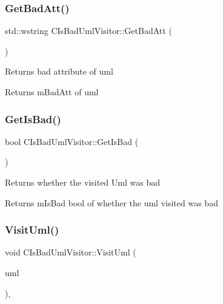 \subsubsection{\texorpdfstring{GetBadAtt()}{GetBadAtt()}}
{\footnotesize\ttfamily std\+::wstring C\+Is\+Bad\+Uml\+Visitor\+::\+Get\+Bad\+Att (\begin{DoxyParamCaption}{ }\end{DoxyParamCaption})\hspace{0.3cm}{\ttfamily [inline]}}

Returns bad attribute of uml \begin{DoxyReturn}{Returns}
m\+Bad\+Att of uml 
\end{DoxyReturn}
\mbox{\label{class_c_is_bad_uml_visitor_ad7abecc1adc872930e938ef4528fd44e}} 
\subsubsection{\texorpdfstring{GetIsBad()}{GetIsBad()}}
{\footnotesize\ttfamily bool C\+Is\+Bad\+Uml\+Visitor\+::\+Get\+Is\+Bad (\begin{DoxyParamCaption}{ }\end{DoxyParamCaption})\hspace{0.3cm}{\ttfamily [inline]}}

Returns whether the visited Uml was bad \begin{DoxyReturn}{Returns}
m\+Is\+Bad bool of whether the uml visited was bad 
\end{DoxyReturn}
\mbox{\label{class_c_is_bad_uml_visitor_a749753fc1c57d534faf60a016a4fd745}} 
\subsubsection{\texorpdfstring{VisitUml()}{VisitUml()}}
{\footnotesize\ttfamily void C\+Is\+Bad\+Uml\+Visitor\+::\+Visit\+Uml (\begin{DoxyParamCaption}\item[{\mbox{\hyperlink{class_c_uml_box}{C\+Uml\+Box}} $\ast$}]{uml }\end{DoxyParamCaption})\hspace{0.3cm}{\ttfamily [override]}, {\ttfamily [virtual]}}

